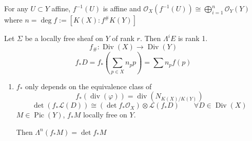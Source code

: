 \begin{defn}\leavevmode
	For any $ U\subset Y$ affine, $f^{-1}(U)$ is affine and $\mathcal{O}_X(f^{-1}(U))\cong \bigoplus_{i=1} ^n\mathcal{O}_Y(Y) $ where $n=\operatorname{deg}f:=[K(X):f^\# K(Y)]$
\end{defn}

Let $\Sigma$ be a locally free sheaf on $Y$ of rank $r$. Then $\Lambda^{i}E$ is rank 1.
		\[f_\#:\operatorname{Div}(X)\longrightarrow \operatorname{Div}(Y)\]
	\[f_* D=f_* \left( \sum_{p\in X}n_pp \right) =\sum n_pf(p)\]

\begin{enumerate}[label=\alph*.]
	\item $f_*$ only depends on the equivalence class of 
		\[f_*(\operatorname{div}(\varphi))=\operatorname{div}(N_{K(X)/K(Y)})\]
		\[\det(f_* \mathcal{L}(D))\cong (\det f_* \mathcal{O}_X)\otimes \mathcal{L}(f_* D)\qquad \forall D\in\operatorname{Div}(X)\]
		$M\in\operatorname{Pic}(Y)$, $f_* M$ locally free on $Y$.

		Then $\Lambda^{n}(f_* M)=\det  f_* M$
\end{enumerate}

